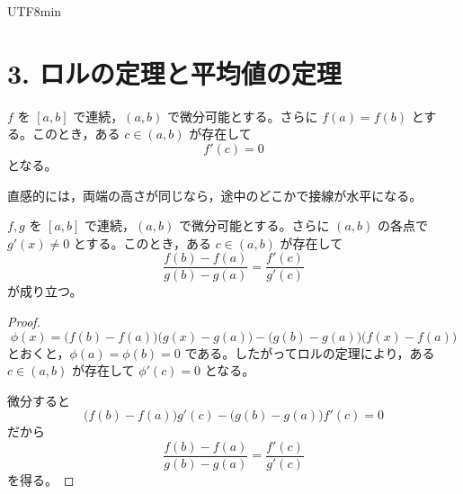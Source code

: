 \documentclass[a4paper,12pt]{article}
\begin{document}
\begin{CJK}{UTF8}{min}
\section*{3. ロルの定理と平均値の定理}

\begin{theorem}[ロルの定理]
$f$ を $[a,b]$ で連続，$(a,b)$ で微分可能とする。さらに $f(a)=f(b)$ とする。このとき，ある $c\in (a,b)$ が存在して
\[
f'(c)=0
\]
となる。
\end{theorem}

直感的には，両端の高さが同じなら，途中のどこかで接線が水平になる。

\begin{center}
\end{center}

\begin{theorem}[コーシーの平均値の定理]
$f,g$ を $[a,b]$ で連続，$(a,b)$ で微分可能とする。さらに $(a,b)$ の各点で $g'(x)\neq 0$ とする。このとき，ある $c\in (a,b)$ が存在して
\[
\frac{f(b)-f(a)}{g(b)-g(a)}=\frac{f'(c)}{g'(c)}
\]
が成り立つ。
\end{theorem}

\begin{proof}
\[
\phi(x)=\bigl(f(b)-f(a)\bigr)\bigl(g(x)-g(a)\bigr)
-\bigl(g(b)-g(a)\bigr)\bigl(f(x)-f(a)\bigr)
\]
とおくと，$\phi(a)=\phi(b)=0$ である。したがってロルの定理により，ある $c\in(a,b)$ が存在して $\phi'(c)=0$ となる。

微分すると
\[
\bigl(f(b)-f(a)\bigr)g'(c)-\bigl(g(b)-g(a)\bigr)f'(c)=0
\]
だから
\[
\frac{f(b)-f(a)}{g(b)-g(a)}=\frac{f'(c)}{g'(c)}
\]
を得る。
\end{proof}


\end{CJK}
\end{document}
